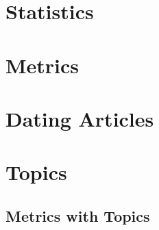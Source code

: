 \documentclass[a4paper,11pt] {article}
\begin{document}
\tableofcontents
\newpage{}




\section{Statistics}








\section{Metrics}\label{metrics}






\section{Dating Articles}


\section{Topics}


\subsection{Metrics with Topics}





\end{document}

